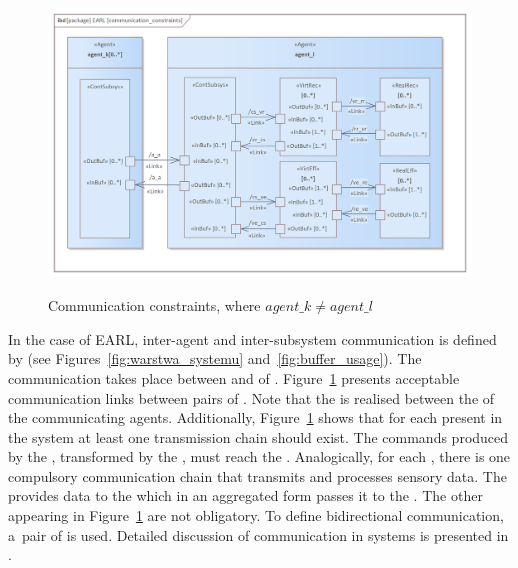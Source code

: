 \documentclass[11pt,oneside,a4paper]{article}
\newcommand{\Figure}[0]{Figure}
\newcommand{\Figures}[0]{Figures}
\begin{document}
	
	\begin{figure}[h]
		\centering
		\begin{center}
			{\includegraphics[width=0.95\columnwidth]{img/basic_earl_model/communication_constraints.png}}
		\end{center}
		\caption{Communication constraints, where $agent\_k \neq agent\_l$}
		\label{fig:communication}
	\end{figure}	
	
	In the case of EARL, inter-agent and inter-subsystem communication \cite{Zie:06Springer} is defined by \UnidirectionalCommunicationLinks{} (see \Figures{}~\ref{fig:warstwa_systemu} and~\ref{fig:buffer_usage}).
	The communication takes place between \InputBuffers{} and \OutputBuffers{} of \Subsystems.
	\Figure{}~\ref{fig:communication} presents acceptable communication links between pairs of \Subsystems{}.
	Note that the \InterAgentCommunication{} is realised between the \ControlSubsystems{} of the communicating agents.
	Additionally, \Figure{}~\ref{fig:communication} shows that for each \RealEffector{} present in the system at least one transmission chain should exist.
	The commands produced by the \ControlSubsystem{}, transformed by the \VirtualEffector{}, must reach the \RealEffector{}.
	Analogically, for each \RealReceptor{}, there is one compulsory communication chain that transmits and processes sensory data. The \RealReceptor{} provides data to the
	\VirtualReceptor{} which in an aggregated form passes it to the \ControlSubsystem{}. The other \CommunicationLinks{} appearing in \Figure{}~\ref{fig:communication} are not obligatory.
	To define bidirectional communication, a~pair of \UnidirectionalCommunicationLinks{} is used. Detailed discussion of communication in \EmbodiedAgent{} systems is presented in \cite{hexel-jint2019}.
	
\end{document}
